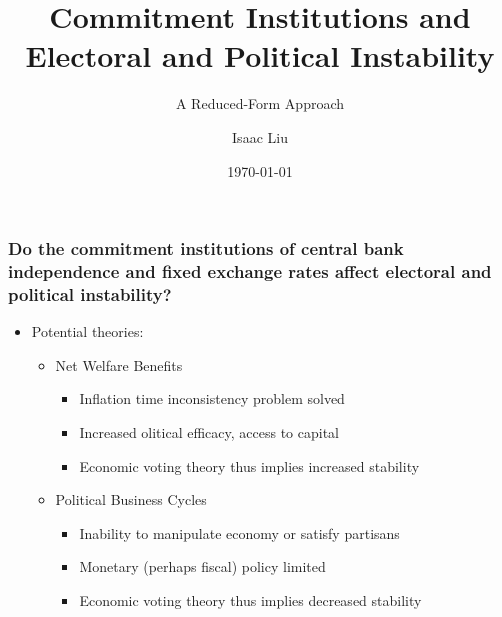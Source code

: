 \documentclass{beamer}
\title[Commitment Institutions and Instability]{Commitment Institutions and Electoral and Political Instability}
\subtitle{A Reduced-Form Approach}
\author{Isaac Liu}
\date{\today}
\begin{document}
    \begin{frame}
        \titlepage
    \end{frame}

    \begin{frame}
        \frametitle{\small Do the commitment institutions of central bank independence and fixed exchange rates affect electoral and political instability?}
        \begin{itemize}
            \item Potential theories:
            \begin{itemize}
                \item Net Welfare Benefits
                \begin{itemize}
                    \item Inflation time inconsistency problem solved
                    \item Increased olitical efficacy, access to capital
                    \item Economic voting theory thus implies increased stability
                \end{itemize}
                \item Political Business Cycles
                \begin{itemize}
                    \item Inability to manipulate economy or satisfy partisans
                    \item Monetary (perhaps fiscal) policy limited
                    \item Economic voting theory thus implies decreased stability
                \end{itemize}
            \end{itemize}
        \end{itemize}

        \begin{figure}[h]
    

\end{figure}
\end{frame}
\end{document}

